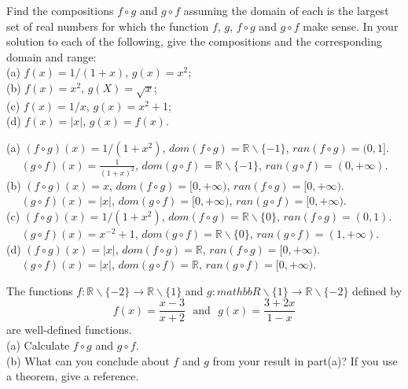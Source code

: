 \documentclass[11pt, a4paper, UTF8]{ctexart}
\begin{document}
\begin{problem}[UD: 15.1]
  Find the compositions $f \circ g$ and $g \circ f$ assuming the domain of each is 
  the largest set of real numbers for which the function $f$, $g$, $f \circ g$ and 
  $g \circ f$ make sense. In your solution to each of the following, give the compositions 
  and the corresponding domain and range:\\
  (a) $f(x) = 1/(1 + x)$, $g(x) = x^{2}$;\\
  (b) $f(x) = x^{2}$, $g(X) = \sqrt{x}$;\\
  (c) $f(x) = 1/x$, $g(x) = x^{2} + 1$;\\
  (d) $f(x) = |x|$, $g(x) = f(x)$.
\end{problem}

\begin{solution}
  (a) $(f \circ g)(x) = 1/(1 + x^{2})$, $dom(f \circ g) = \mathbb{R} \backslash \{-1\}$, 
  $ran(f \circ g) = (0,1]$.\\
  $~~~~~~(g \circ f)(x) = \frac{1}{(1 + x)^{2}}$, $dom(g \circ f) = \mathbb{R} \backslash \{-1\}$, 
  $ran(g \circ f) = (0,+\infty)$.\\
  (b) $(f \circ g)(x) = x$, $dom(f \circ g) = [0,+\infty)$, $ran(f \circ g) = [0,+\infty)$.\\
  $~~~~~~(g \circ f)(x) = |x|$, $dom(g \circ f) = [0,+\infty)$, $ran(g \circ f) = [0,+\infty)$.\\
  (c) $(f \circ g)(x) = 1/(1 + x^{2})$, $dom(f \circ g) = \mathbb{R} \backslash \{0\}$, 
  $ran(f \circ g) = (0,1)$.\\
  $~~~~~~(g \circ f)(x) = x^{-2} + 1$, $dom(g \circ f) = \mathbb{R} \backslash \{0\}$, 
  $ran(g \circ f) = (1,+\infty)$.\\
  (d) $(f \circ g)(x) = |x|$, $dom(f \circ g) = \mathbb{R}$, $ran(f \circ g) = [0,+\infty)$.\\
  $~~~~~~(g \circ f)(x) = |x|$, $dom(g \circ f) = \mathbb{R}$, $ran(g \circ f) = [0,+\infty)$.
\end{solution}

\begin{problem}[UD: 15.6]
  The functions $f:\mathbb{R} \backslash \{-2\} \rightarrow \mathbb{R} \backslash \{1\}$ 
  and $g:mathbb{R} \backslash \{1\} \rightarrow \mathbb{R} \backslash \{-2\}$ defined 
  by
  $$f(x) = \frac{x - 3}{x + 2} \text{~~and~~} g(x) = \frac{3 + 2x}{1 - x}$$
  are well-defined functions.\\
  (a) Calculate $f \circ g$ and $g \circ f$.\\
  (b) What can you conclude about $f$ and $g$ from your result in part(a)? If you 
  use a theorem, give a reference.
\end{problem}
\end{document}
